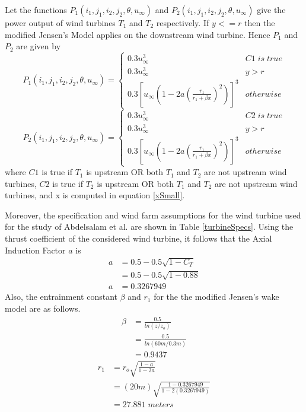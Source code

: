     Let the functions $P_1(i_1,j_1,i_2,j_2,\theta,u_\infty)$ and $P_2(i_1,j_1,i_2,j_2,\theta,u_\infty)$ give the power output of wind turbines $T_1$ and $T_2$ respectively. If $y<=r$ then the modified Jensen's Model applies on the downstream wind turbine. Hence $P_1$ and $P_2$ are given by
    \begin{equation}
        P_1(i_1,j_1,i_2,j_2,\theta,u_\infty) =
        \begin{cases} 
            0.3u_\infty^3 & C1 \;is\;true \\
            0.3u_\infty^3 & y > r \\
            0.3\left[ u_\infty\left(1 - 2a\left(\frac{r_{1}}{r_{1}+\beta x}\right)^2\right) \right]^3 & otherwise
        \end{cases}
    \end{equation}
    \begin{equation}
        P_2(i_1,j_1,i_2,j_2,\theta,u_\infty) =
        \begin{cases} 
            0.3u_\infty^3 & C2 \;is\;true \\
            0.3u_\infty^3 & y > r \\
            0.3\left[ u_\infty\left(1 - 2a\left(\frac{r_{1}}{r_{1}+\beta x}\right)^2\right) \right]^3 & otherwise
        \end{cases}
    \end{equation}
    where $C1$ is true if $T_1$ is upstream OR both $T_1$ and $T_2$ are not upstream wind turbines, $C2$ is true if $T_2$ is upstream OR both $T_1$ and $T_2$ are not upstream wind turbines, and x is computed in equation \ref{xSmall}.
    
    Moreover, the specification and wind farm assumptions for the wind turbine used for the study of Abdelsalam et al. \cite{this} are shown in Table \ref{turbineSpecs}. Using the thrust coefficient of the considered wind turbine, it follows that the Axial Induction Factor $a$ is
    \begin{align*}
        a
        &=0.5-0.5\sqrt{1-C_T} \\
        &=0.5-0.5\sqrt{1-0.88} \\
        a &= 0.3267949
    \end{align*}
    Also, the entrainment constant $\beta$ and $r_1$ for the the modified Jensen's wake model are as follows.
    \begin{align*}
        \beta
        &=\frac{0.5}{ln(z/z_o)} \\
        &=\frac{0.5}{ln(60m/0.3m)} \\
        &=0.9437
    \end{align*}
    \begin{align*}
        r_1
        &=r_o\sqrt{\frac{1-a}{1-2a}} \\
        &=(20m)\sqrt{\frac{1-0.3267949}{1-2(0.3267949)}} \\
        &=27.881\;meters
    \end{align*}
        
